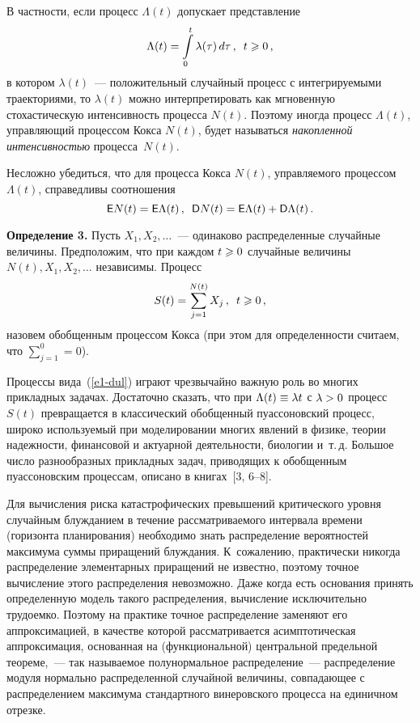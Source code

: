 \begin{multicols}{2}
В частности, если процесс $\Lambda(t)$ допускает представление
$$
\Lambda(t)=\int\limits_{0}^{t}\lambda(\tau)\,d\tau\,,\enskip t\geqslant 0\,,
$$
в котором $\lambda(t)$~--- положительный случайный процесс с
интегрируемыми траекториями, то $\lambda(t)$ можно
интерпретировать как мгновенную стохастическую интенсивность
процесса $N(t)$. Поэтому \mbox{иногда} процесс $\Lambda(t)$, управ\-ля\-ющий
процессом Кокса $N(t)$, будет называться {\it накопленной
ин\-тен\-сив\-ностью} процесса~$N(t)$.

Несложно убедиться, что для процесса Кокса $N(t)$, управляемого
процессом $\Lambda(t)$, справедливы соотношения
$$
{\sf E}N(t)={\sf E}\Lambda(t)\,,\enskip{\sf D}N(t)={\sf
E}\Lambda(t)+{\sf D}\Lambda(t)\,.
$$

\smallskip

\noindent
\textbf{Определение 3.} Пусть $X_1,X_2,\ldots$~--- одинаково
распределенные случайные величины. Предположим, что при каждом $t\hm\geqslant
 0$ случайные величины $N(t),X_1,X_2,\ldots$ независимы. Процесс
\begin{equation}
S(t)=\sum\limits_{j=1}^{N(t)}X_j\,,\enskip t\geqslant 0\,,
\label{e1-dul}
\end{equation}
назовем обобщенным процессом Кокса (при этом для определенности
считаем, что $\sum\limits_{j=1}^{0} =0$).

\smallskip

Процессы вида~(\ref{e1-dul}) играют чрезвычайно важную роль во многих
прикладных задачах. Достаточно сказать, что при $\Lambda(t) \hm\equiv
\lambda t$ с $\lambda \hm> 0$ процесс $S(t)$ превращается в
классический обобщенный пуассоновский процесс, широко используемый
при моделировании многих явлений в физике, теории надежности,
финансовой и актуарной деятельности, биологии и~т.\,д. Большое число
разнообразных прикладных задач, приводящих к обобщенным
пуассоновским процессам, описано в книгах~[3, 6--8].

Для вычисления риска катастрофических превышений критического уровня
случайным блуж\-да\-ни\-ем в течение рассматриваемого интервала времени
(горизонта планирования) необходимо знать распределение вероятностей
максимума суммы приращений блуждания. К~сожалению, практически
никогда распределение элементарных приращений не известно, поэтому
точное вычисление этого распределения невозможно. Даже когда есть
основания принять определенную модель такого распределения,
вычисление исключительно трудоемко. Поэтому на практике точное
распределение заменяют его аппроксимацией, в качестве которой
рассматривается асимптотическая аппроксимация, основанная на
(функциональной) центральной предельной теореме,~--- так на\-зы\-ва\-емое
полунормальное распределение~--- распределение модуля нормально
распределенной случайной величины, совпадающее с распределением
максимума стандартного винеровского процесса на единичном отрезке.


\end{multicols}
